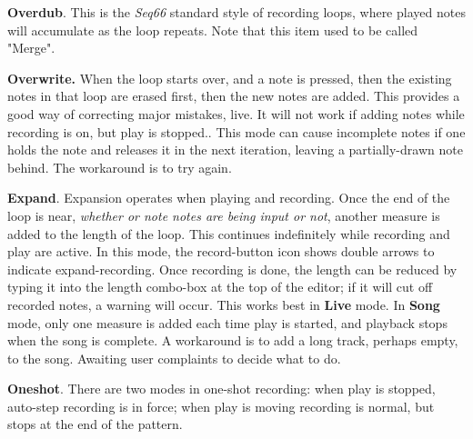    \begin{enumber}
      \item \textbf{Overdub}.
         This is the \textsl{Seq66} standard
         style of recording loops, where played notes will
         accumulate as the loop repeats.
         Note that this item used to be called "Merge".
      \item \textbf{Overwrite.}
         When the loop starts over, and a note is pressed,
         then the existing notes in that loop are erased first,
         then the new notes are added.
         This provides a good way of correcting major mistakes, live.
         It will not work if adding notes while recording is on, but
         play is stopped..
         This mode can cause incomplete notes if one
         holds the note and releases it in the next iteration, leaving a
         partially-drawn note behind.  The workaround is to try again.
      \item \textbf{Expand}.
         Expansion operates when playing and recording.
         Once the end of the loop is near, \textsl{whether or note
         notes are being input or not},
         another measure is added to the length of the loop.
         This continues indefinitely while recording and play are active.
         In this mode, the record-button icon shows double arrows to indicate
         expand-recording.
         Once recording is done,
         the length can be reduced by typing it into the length combo-box
         at the top of the editor; if it will cut off recorded notes,
         a warning will occur.
         This works best in \textbf{Live} mode.
         In \textbf{Song} mode, only one measure is added each time play is
         started, and playback stops when the song is complete.
         A workaround is to add a long track, perhaps empty, to the song.
         Awaiting user complaints to decide what to do.
      \item \textbf{Oneshot}.
         There are two modes in one-shot recording:
         when play is stopped, auto-step recording is in force; when play
         is moving recording is normal, but stops at the end of the pattern.
         \begin{itemize}

\end{itemize}
\end{enumber}

